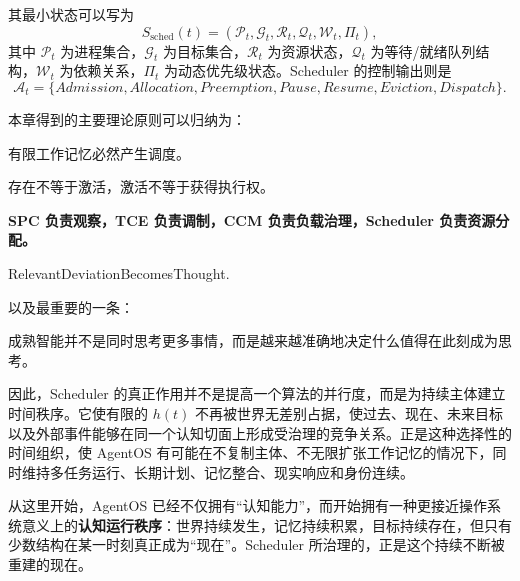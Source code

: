 其最小状态可以写为
\[
S_{\mathrm{sched}}(t)
=
(
\mathcal P_t,
\mathcal G_t,
\mathcal R_t,
\mathcal Q_t,
\mathcal W_t,
\Pi_t
),
\]
其中 $\mathcal P_t$ 为进程集合，$\mathcal G_t$ 为目标集合，$\mathcal R_t$ 为资源状态，$\mathcal Q_t$ 为等待/就绪队列结构，$\mathcal W_t$ 为依赖关系，$\Pi_t$ 为动态优先级状态。Scheduler 的控制输出则是
\[
\mathcal A_t
=
\{
Admission,
Allocation,
Preemption,
Pause,
Resume,
Eviction,
Dispatch
\}.
\]

本章得到的主要理论原则可以归纳为：
\begin{proposition*}
有限工作记忆必然产生调度。
\end{proposition*}

\begin{statementbox}
存在不等于激活，激活不等于获得执行权。
\end{statementbox}

\begin{center}
\bfseries SPC 负责观察，TCE 负责调制，CCM 负责负载治理，Scheduler 负责资源分配。
\end{center}

\begin{statementbox}
\centering
{}
\end{statementbox}

\begin{statementbox}
\centering
{}
\end{statementbox}

\begin{statementbox}
RelevantDeviationBecomesThought.
\end{statementbox}

\begin{statementbox}
\centering
{}
\end{statementbox}

以及最重要的一条：
\begin{statementbox}
成熟智能并不是同时思考更多事情，而是越来越准确地决定什么值得在此刻成为思考。
\end{statementbox}

因此，Scheduler 的真正作用并不是提高一个算法的并行度，而是为持续主体建立时间秩序。它使有限的 $h(t)$ 不再被世界无差别占据，使过去、现在、未来目标以及外部事件能够在同一个认知切面上形成受治理的竞争关系。正是这种选择性的时间组织，使 AgentOS 有可能在不复制主体、不无限扩张工作记忆的情况下，同时维持多任务运行、长期计划、记忆整合、现实响应和身份连续。

从这里开始，AgentOS 已经不仅拥有“认知能力”，而开始拥有一种更接近操作系统意义上的\textbf{认知运行秩序}：世界持续发生，记忆持续积累，目标持续存在，但只有少数结构在某一时刻真正成为“现在”。Scheduler 所治理的，正是这个持续不断被重建的现在。
